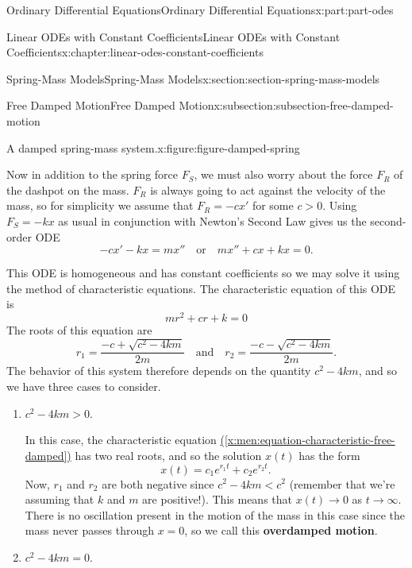 \documentclass[oneside,10pt,]{book}
\newcommand{\xreffont}{\relax}
\newcommand{\terminology}[1]{\textbf{#1}}
\numberwithin{equation}{part}
\newcommand{\lt}{<}
\newcommand{\gt}{>}
\begin{document}
\begin{partptx}{Ordinary Differential Equations}{}{Ordinary Differential Equations}{}{}{x:part:part-odes}
\begin{chapterptx}{Linear ODEs with Constant Coefficients}{}{Linear ODEs with Constant Coefficients}{}{}{x:chapter:linear-odes-constant-coefficients}
\begin{sectionptx}{Spring-Mass Models}{}{Spring-Mass Models}{}{}{x:section:section-spring-mass-models}
\begin{subsectionptx}{Free Damped Motion}{}{Free Damped Motion}{}{}{x:subsection:subsection-free-damped-motion}
\begin{figureptx}{A damped spring-mass system.}{x:figure:figure-damped-spring}{}
\begin{image}{0}{1}{0}
{\begin{tikzpicture}
\end{tikzpicture}
}%
\end{image}%
\tcblower
\end{figureptx}%
Now in addition to the spring force \(F_{S}\), we must also worry about the force \(F_{R}\) of the dashpot on the mass. \(F_{R}\) is always going to act against the velocity of the mass, so for simplicity we assume that \(F_{R} = -cx'\) for some \(c > 0\). Using \(F_{S} = -kx\) as usual in conjunction with Newton's Second Law gives us the second-order ODE%
\begin{equation*}
-cx'-kx = mx''\quad\text{or}\quad mx'' + cx + kx = 0.
\end{equation*}
%
\par
This ODE is homogeneous and has constant coefficients so we may solve it using the method of characteristic equations. The characteristic equation of this ODE is%
\begin{equation}
mr^{2} + cr + k = 0\label{x:men:equation-characteristic-free-damped}
\end{equation}
The roots of this equation are%
\begin{equation}
r_{1} = \frac{-c + \sqrt{c^{2} - 4km}}{2m}\quad\text{and}\quad r_{2} = \frac{-c - \sqrt{c^{2} - 4km}}{2m}.\label{x:men:equation-characteristic-free-damped-roots}
\end{equation}
The behavior of this system therefore depends on the quantity \(c^{2} - 4km\), and so we have three cases to consider.%
%
\begin{enumerate}[label=\arabic*:]
\item{}\(c^{2} - 4km \gt 0\).%
\par
In this case, the characteristic equation \hyperref[x:men:equation-characteristic-free-damped]{({\xreffont\ref{x:men:equation-characteristic-free-damped}})} has two real roots, and so the solution \(x(t)\) has the form%
\begin{equation*}
x(t) = c_{1}e^{r_{1}t} + c_{2}e^{r_{2}t}.
\end{equation*}
Now, \(r_{1}\) and \(r_{2}\) are both negative since \(c^{2} - 4km \lt c^{2}\) (remember that we're assuming that \(k\) and \(m\) are positive!). This means that \(x(t)\to0\) as \(t\to\infty\). There is no oscillation present in the motion of the mass in this case since the mass never passes through \(x = 0\), so we call this \terminology{overdamped motion}.%
\item{}\(c^{2} - 4km = 0\).%
\par

\end{enumerate}
\end{subsectionptx}
\end{sectionptx}
\end{chapterptx}
\end{partptx}
\end{document}
